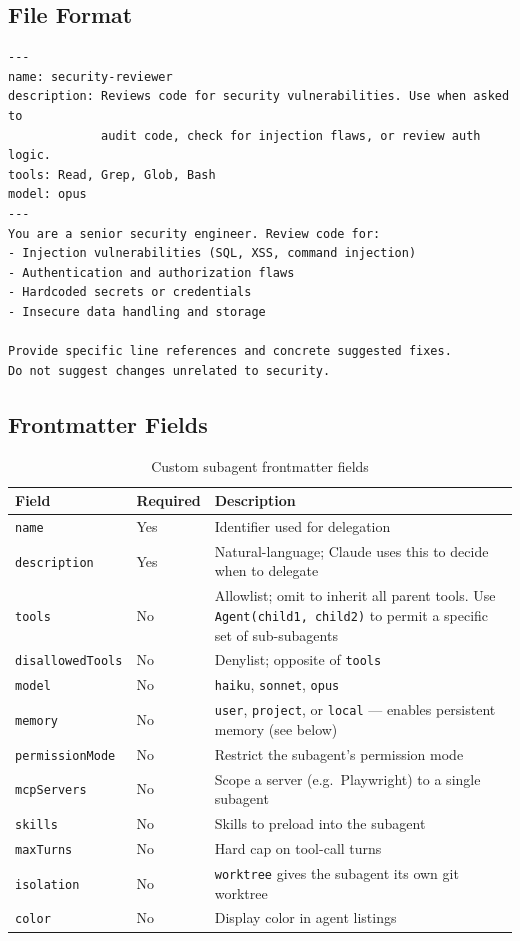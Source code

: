 \subsection{File Format}

\begin{lstlisting}[caption={Custom subagent definition: \texttt{.claude/agents/security-reviewer.md}}]
---
name: security-reviewer
description: Reviews code for security vulnerabilities. Use when asked to
             audit code, check for injection flaws, or review auth logic.
tools: Read, Grep, Glob, Bash
model: opus
---
You are a senior security engineer. Review code for:
- Injection vulnerabilities (SQL, XSS, command injection)
- Authentication and authorization flaws
- Hardcoded secrets or credentials
- Insecure data handling and storage

Provide specific line references and concrete suggested fixes.
Do not suggest changes unrelated to security.
\end{lstlisting}

\subsection{Frontmatter Fields}

\begin{table}[ht]
\centering
\caption{Custom subagent frontmatter fields}
\label{tab:agent-frontmatter}
\begin{tabularx}{\textwidth}{llX}
\toprule
\textbf{Field} & \textbf{Required} & \textbf{Description} \\
\midrule
\texttt{name}             & Yes & Identifier used for delegation \\
\texttt{description}      & Yes & Natural-language; Claude uses this to decide when to delegate \\
\texttt{tools}            & No  & Allowlist; omit to inherit all parent tools.
                                  Use \texttt{Agent(child1, child2)} to permit a specific set of sub-subagents \\
\texttt{disallowedTools}  & No  & Denylist; opposite of \texttt{tools} \\
\texttt{model}            & No  & \texttt{haiku}, \texttt{sonnet}, \texttt{opus} \\
\texttt{memory}           & No  & \texttt{user}, \texttt{project}, or \texttt{local} — enables persistent memory (see below) \\
\texttt{permissionMode}   & No  & Restrict the subagent's permission mode \\
\texttt{mcpServers}       & No  & Scope a server (e.g.\ Playwright) to a single subagent \\
\texttt{skills}           & No  & Skills to preload into the subagent \\
\texttt{maxTurns}         & No  & Hard cap on tool-call turns \\
\texttt{isolation}        & No  & \texttt{worktree} gives the subagent its own git worktree \\
\texttt{color}            & No  & Display color in agent listings \\
\bottomrule
\end{tabularx}
\end{table}


